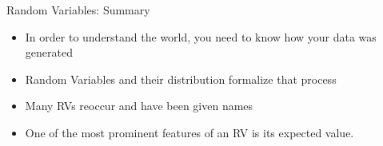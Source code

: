 \documentclass[aspectratio=169]{../latex_main/tntbeamer}  %
\begin{document}
	
	
	
	\begin{frame}{Random Variables: Summary}
	      \begin{itemize}
	          \item In order to understand the world, you need to know how your data was generated
	          \item Random Variables and their distribution formalize that process
	          \item Many RVs reoccur and have been given names
	          \item One of the most prominent features of an RV is its expected value.
	      \end{itemize}
	  
	\end{frame}
	
\end{document}
